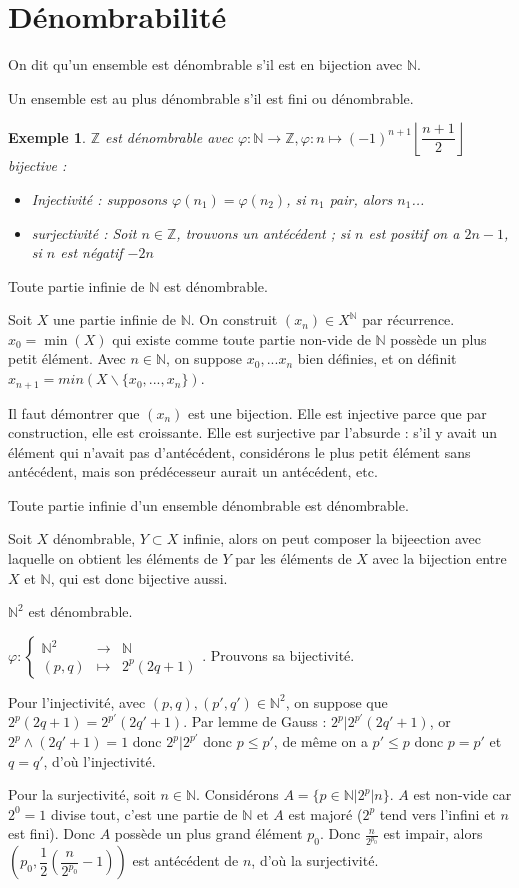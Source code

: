 \documentclass[a4paper,12pt]{book}
\newcommand{\Def}[2]{\begin{tcolorbox}[sharp corners, colback=white,colframe=blue!90!black!75, title=Définition : #1]#2\end{tcolorbox}}
\newcommand{\Prop}[2]{\begin{tcolorbox}[sharp corners, colback=white,colframe=red!90!black!75, title=Proposition : #1]#2\end{tcolorbox}}
\newcommand{\Pre}[1]{\begin{tcolorbox}[sharp corners, colback=white,colframe=green!60!green!30!black!75, title=Preuve]#1\end{tcolorbox}}
\newtheorem{Exe}{Exemple}[section]
\def\N{\mathbb{N}}
\def\Z{\mathbb{Z}}
\begin{document}
\section{Dénombrabilité}
\Def{Dénombrable}{On dit qu'un ensemble est dénombrable s'il est en bijection avec $\N$.}
\Def{Au plus dénombrable}{Un ensemble est au plus dénombrable s'il est fini ou dénombrable.}
\begin{Exe}
$\Z$ est dénombrable avec $\varphi:\N\to\Z, \varphi:n\mapsto (-1)^{n+1}\left\lfloor\dfrac{n+1}{2}\right\rfloor$ bijective :\begin{itemize}
\item Injectivité : supposons $\varphi(n_1)=\varphi(n_2)$, si $n_1$ pair, alors $n_1$...
\item surjectivité : Soit $n\in\Z$, trouvons un antécédent ; si $n$ est positif on a $2n-1$, si $n$ est négatif $-2n$\end{itemize} 
\end{Exe}
\Prop{Parties infinies de $\N$}{Toute partie infinie de $\N$ est dénombrable.}
\Pre{Soit $X$ une partie infinie de $\N$. On construit $(x_n)\in X^\N$ par récurrence. $x_0 =\min(X)$ qui existe comme toute partie non-vide de $\N$ possède un plus petit élément. Avec $n\in\N$, on suppose $x_0,... x_n$ bien définies, et on définit $x_{n+1} = min(X\backslash\{x_0,...,x_n\})$.
\par Il faut démontrer que $(x_n)$ est une bijection. Elle est injective parce que par construction, elle est croissante. Elle est surjective par l'absurde : s'il y avait un élément qui n'avait pas d'antécédent, considérons le plus petit élément sans antécédent, mais son prédécesseur aurait un antécédent, etc.}
\Prop{Parties infinies}{Toute partie infinie d'un ensemble dénombrable est dénombrable.}
\Pre{Soit $X$ dénombrable, $Y\subset X$ infinie, alors on peut composer la bijeection avec laquelle on obtient les éléments de $Y$ par les éléments de $X$ avec la bijection entre $X$ et $\N$, qui est donc bijective aussi.}
\Prop{Produit cartésien}{$\N^2$ est dénombrable.}
\Pre{$\varphi :\left\{\begin{array}{rcl} \N^2&\to&\N \\ (p,q) &\mapsto&2^p(2q+1) \end{array}\right.$. Prouvons sa bijectivité. 
\par Pour l'injectivité, avec $(p,q), (p',q')\in\N^2$, on suppose que $2^p(2q+1) = 2^{p'}(2q'+1)$. Par lemme de Gauss : $2^p\vert 2^{p'}(2q'+1)$, or $2^p\wedge (2q'+1)=1$ donc $2^p\vert 2^{p'}$ donc $p\leq p'$, de même on a $p'\leq p$ donc $p=p'$ et $q=q'$, d'où l'injectivité.
\par Pour la surjectivité, soit $n\in\N$. Considérons $A=\{p\in\N\vert 2^p\vert n\}$. $A$ est non-vide car $2^0=1$ divise tout, c'est une partie de $\N$ et $A$ est majoré ($2^p$ tend vers l'infini et $n$ est fini). Donc $A$ possède un plus grand élément $p_0$. Donc $\frac{n}{2^{p_0}}$ est impair, alors $(p_0, \dfrac{1}{2}(\dfrac{n}{2^{p_0}}-1))$ est antécédent de $n$, d'où la surjectivité.}
\end{document}
